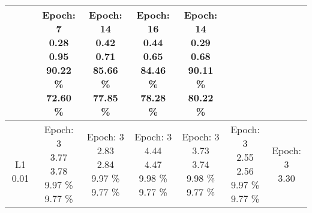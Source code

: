 \begin{center}
\begin{tabular}{ |c|c|c|c|c|c|c| }
{} & \makecell{
Epoch: 7 \\
0.28 \\
0.95 \\
90.22 \% \\
72.60 \% \\
} & \makecell{
Epoch: 14 \\
0.42 \\
0.71 \\
85.66 \% \\
77.85 \% \\
} & \makecell{
Epoch: 16 \\
0.44 \\
0.65 \\
84.46 \% \\
78.28 \% \\
} & \makecell{
Epoch: 14 \\
0.29 \\
0.68 \\
90.11 \% \\
80.22 \% \\
} \\
\hline
\thead{\\L1 0.01} & \makecell{
Epoch: 3 \\
3.77 \\
3.78 \\
9.97 \% \\
9.77 \% \\
} & \makecell{
Epoch: 3 \\
2.83 \\
2.84 \\
9.97 \% \\
9.77 \% \\
} & \makecell{
Epoch: 3 \\
4.44 \\
4.47 \\
9.98 \% \\
9.77 \% \\
} & \makecell{
Epoch: 3 \\
3.73 \\
3.74 \\
9.98 \% \\
9.77 \% \\
} & \makecell{
Epoch: 3 \\
2.55 \\
2.56 \\
9.97 \% \\
9.77 \% \\
} & \makecell{
Epoch: 3 \\
3.30 \\
}
\end{tabular}
\end{center}
